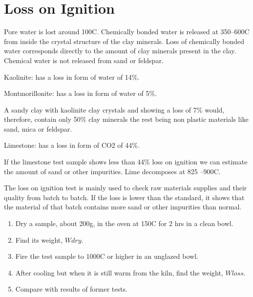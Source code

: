 \section{Loss on Ignition}
Pore water is lost around 100\degree C. Chemically bonded water is released at 
350\degree --600\degree C from inside the crystal structure of the clay 
minerals. Loss of chemically bonded water corresponds directly to the amount of 
clay minerals present in the clay. Chemical water is not released from sand or 
feldspar.

Kaolinite:  has a loss in form of 
water of 14\%.

Montmorillonite:  has a loss in form 
of water of 5\%.

A sandy clay with kaolinite clay crystals and showing a loss of 7\% would, 
therefore, contain only 50\% clay minerals the rest being non plastic materials 
like sand, mica or feldspar.

Limestone:  has a loss in form of CO2 of 44\%.

If the limestone test sample shows less than 44\% loss on ignition we can 
estimate the amount of sand or other impurities. Lime decomposes at 825\degree 
--900\degree C.

The loss on ignition test is mainly used to check raw materials supplies and 
their quality from batch to batch. If the loss is lower than the standard, it 
shows that the material of that batch contains more sand or other impurities 
than normal.
\begin{enumerate}
  \item Dry a sample, about 200g, in the oven at 150\degree C for 2 hrs 
in a clean bowl.
\item Find its weight, $Wdry$. 
\item Fire the test sample to 1000\degree C or higher in an unglazed bowl. 
\item After cooling but when it is still warm from the kiln, find the weight, 
$Wloss$. 
\item Compare with results of former tests.
\end{enumerate}
